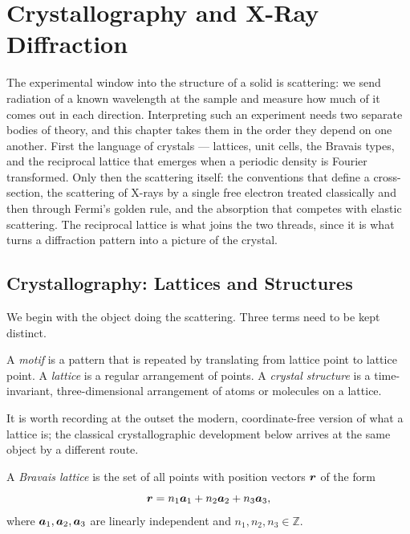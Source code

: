 \chapter{Crystallography and X-Ray Diffraction}

The experimental window into the structure of a solid is scattering: we send radiation of a known wavelength at the sample and measure how much of it comes out in each direction. Interpreting such an experiment needs two separate bodies of theory, and this chapter takes them in the order they depend on one another. First the language of crystals --- lattices, unit cells, the Bravais types, and the reciprocal lattice that emerges when a periodic density is Fourier transformed. Only then the scattering itself: the conventions that define a cross-section, the scattering of X-rays by a single free electron treated classically and then through Fermi's golden rule, and the absorption that competes with elastic scattering. The reciprocal lattice is what joins the two threads, since it is what turns a diffraction pattern into a picture of the crystal.

\section{Crystallography: Lattices and Structures}
\label{sec:xrd-crystallography}

We begin with the object doing the scattering. Three terms need to be kept distinct.

\begin{definition}
A \emph{motif} is a pattern that is repeated by translating from lattice point to lattice point. A \emph{lattice} is a regular arrangement of points. A \emph{crystal structure} is a time-invariant, three-dimensional arrangement of atoms or molecules on a lattice.
\end{definition}

It is worth recording at the outset the modern, coordinate-free version of what a lattice is; the classical crystallographic development below arrives at the same object by a different route.

\begin{definition}
A \emph{Bravais lattice} is the set of all points with position vectors $\bm{r}$ of the form
\begin{equation}
    \bm{r} = n_1\bm{a}_1 + n_2\bm{a}_2 + n_3\bm{a}_3,
\end{equation}
where $\bm{a}_1, \bm{a}_2, \bm{a}_3$ are linearly independent and $n_1, n_2, n_3 \in \mathbb{Z}$.
\end{definition}

